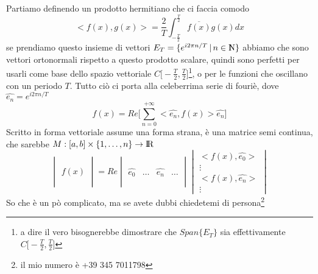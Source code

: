 \documentclass[11pt,a4paper]{article}
\theoremstyle{definition}
\theoremstyle{plain}
\theoremstyle{plain}
\begin{document}
		Partiamo definendo un prodotto hermitiano che ci faccia comodo
		\begin{equation}
			<f(x),g(x)>=\frac{2}{T}\int_{-\frac{T}{2}}^\frac{T}{2} \overline{f(x)}g(x)dx
		\end{equation}
		se prendiamo questo insieme di vettori $E_T=\{e^{i2\pi n/ T} \, | \, n \in \rm I\!\! N\}$ abbiamo che sono vettori ortonormali rispetto a questo prodotto scalare, quindi sono perfetti per usarli come base dello spazio vettoriale $C\big[-\frac{T}{2},\frac{T}{2}\big]$\footnote{a dire il vero bisognerebbe dimostrare che $Span\{E_T\}$ sia effettivamente $C\big[-\frac{T}{2},\frac{T}{2}\big]$}, o per le funzioni che oscillano con un periodo $T$.\newline
		Tutto ciò ci porta alla celeberrima serie di fouriè, dove $\widehat{e_n}=e^{i2\pi n/ T}$
		\begin{equation}
		\label{serieFuriè}
			f(x)=Re\Bigg[\sum_{n=0}^{+\infty} <\widehat{e_n},f(x)>\widehat{e_n}\Bigg]
		\end{equation}
		Scritto in forma vettoriale assume una forma strana, è una matrice semi continua, che sarebbe $M:[a,b]\times \{1,\dots,n\}\rightarrow \rm I\!R$
		\begin{equation}
			\begin{vmatrix}
				\,\\
				\,\\
				f(x)\\
				\,\\
				\,
			\end{vmatrix}
			=Re
			\begin{vmatrix}
				\, & & &\\
				\, & & &\\
				\widehat{e_0}& \dots & \widehat{e_n}&\dots\\
				\, & & &\\
				\, & & &
			\end{vmatrix}
			\begin{vmatrix}
				<f(x),\widehat{e_0}>\\
				\vdots\\
				<f(x),\widehat{e_n}>\\
				\vdots
			\end{vmatrix}
		\end{equation}
		So che è un pò complicato, ma se avete dubbi chiedetemi di persona\footnote{il mio numero è +39 345 7011798}
\end{document}
